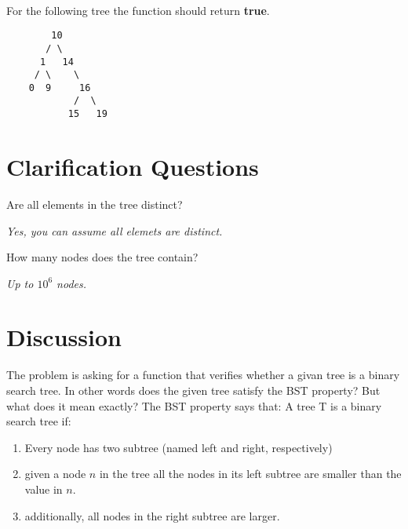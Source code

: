 \begin{example}
\label{example:verify_BST_:one}
	\hfill \\
	For the following tree the function should return \textbf{true}.
	\begin{verbatim}
	    10
	   / \
	  1   14
	 / \    \
    0  9     16
            /  \
           15   19
	\end{verbatim}
	
\end{example}


\section{Clarification Questions}

\begin{QandA}
	\item Are all elements in the tree distinct?
	\begin{answered}
		\textit{Yes, you can assume all elemets are distinct.}
	\end{answered}
	\item How many nodes does the tree contain?
	\begin{answered}
		\textit{Up to $10^6$ nodes.}
	\end{answered}
\end{QandA}

\section{Discussion}
\label{verify_BST:sec:discussion}
The problem is asking for a function that verifies whether a givan tree is a binary search tree. In other words does the given tree satisfy the BST property?  But what does it mean exactly? The BST property says that:
A tree T is a binary search tree if:
\begin{enumerate}
	\item Every node has two subtree (named left and right, respectively)
	\item given a node $n$ in the tree all the nodes in its left subtree are smaller than the value in $n$.
	\item additionally, all nodes in the right subtree are larger.
\end{enumerate}


